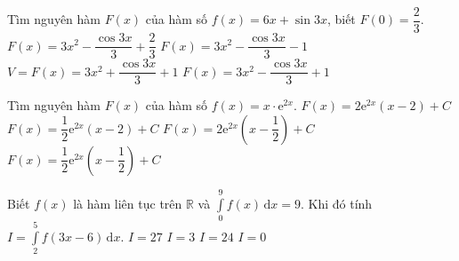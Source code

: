 \begin{ex}%
Tìm nguyên hàm $F(x)$ của hàm số $f(x)=6x+\sin3x$, biết $F(0)=\dfrac{2}{3}$.
\choice
{$F(x)=3x^2-\dfrac{\cos 3x}{3}+\dfrac{2}{3}$}
{$F(x)=3x^2-\dfrac{\cos 3x}{3}-1$}
{$V=F(x)=3x^2+\dfrac{\cos 3x}{3}+1$}
{\True $F(x)=3x^2-\dfrac{\cos 3x}{3}+1$}
\end{ex}

\begin{ex}%
	Tìm nguyên hàm $F(x)$ của hàm số $f(x)=x\cdot \mathrm{e}^{2x}$.
	\choice
	{$F(x)=2\mathrm{e}^{2x}\left(x-2 \right) +C$}
	{$F(x)=\dfrac{1}{2}\mathrm{e}^{2x}\left(x-2 \right) +C$}
	{$F(x)=2\mathrm{e}^{2x}\left(x-\dfrac{1}{2} \right) +C$}
	{\True $F(x)=\dfrac{1}{2}\mathrm{e}^{2x}\left(x-\dfrac{1}{2} \right) +C $}
\end{ex}







\begin{ex}%
Biết $f(x)$ là hàm liên tục trên $\mathbb{R}$ và $\displaystyle\int\limits_0^{9} f(x)\mathrm{\,d}x=9$. Khi đó tính $I= \displaystyle\int\limits_2^{5} f(3x-6)\mathrm{\,d}x.$
\choice
{$I=27$}
{\True $I=3$}
{$I=24$}
{$I=0$}
\end{ex}


